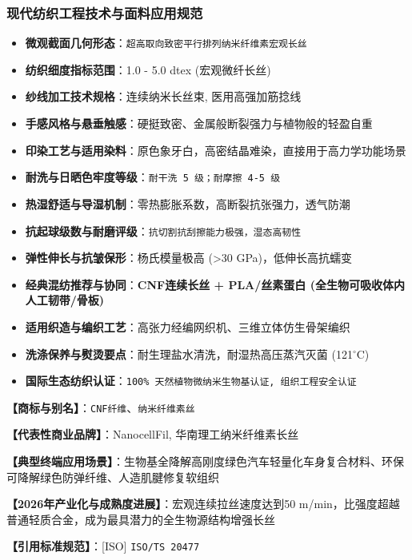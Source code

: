 \documentclass[11pt,openright,twoside,UTF8]{ctexbook}
\begin{document}
\subsubsection*{现代纺织工程技术与面料应用规范}
\begin{itemize} \setlength{\itemsep}{2pt}
    \item \textbf{微观截面几何形态}：\texttt{超高取向致密平行排列纳米纤维素宏观长丝}
    \item \textbf{纺织细度指标范围}：1.0 - 5.0 dtex (宏观微纤长丝)
    \item \textbf{纱线加工技术规格}：连续纳米长丝束, 医用高强加筋捻线
    \item \textbf{手感风格与悬垂触感}：硬挺致密、金属般断裂强力与植物般的轻盈自重
    \item \textbf{印染工艺与适用染料}：原色象牙白，高密结晶难染，直接用于高力学功能场景
    \item \textbf{耐洗与日晒色牢度等级}：\texttt{耐干洗 5 级；耐摩擦 4-5 级}
    \item \textbf{热湿舒适与导湿机制}：零热膨胀系数，高断裂抗张强力，透气防潮
    \item \textbf{抗起球级数与耐磨评级}：\texttt{抗切割抗刮擦能力极强，湿态高韧性}
    \item \textbf{弹性伸长与抗皱保形}：杨氏模量极高 (\textgreater{}30 GPa)，低伸长高抗蠕变
    \item \textbf{经典混纺推荐与协同}：\textbf{CNF连续长丝 + PLA/丝素蛋白 (全生物可吸收体内人工韧带/骨板)}
    \item \textbf{适用织造与编织工艺}：高张力经编网织机、三维立体仿生骨架编织
    \item \textbf{洗涤保养与熨烫要点}：耐生理盐水清洗，耐湿热高压蒸汽灭菌 (121$^\circ\mathrm{C}$)
    \item \textbf{国际生态纺织认证}：\texttt{100\% 天然植物微纳米生物基认证, 组织工程安全认证}
\end{itemize}
\vspace{0.2cm}

\noindent\textbf{【商标与别名】}：\texttt{CNF纤维}、\texttt{纳米纤维素丝}\par
\noindent\textbf{【代表性商业品牌】}：NanocellFil, 华南理工纳米纤维素长丝\par
\noindent\textbf{【典型终端应用场景】}：生物基全降解高刚度绿色汽车轻量化车身复合材料、环保可降解绿色防弹纤维、人造肌腱修复软组织\par
\noindent\textbf{【2026年产业化与成熟度进展】}：宏观连续拉丝速度达到50 m/min，比强度超越普通轻质合金，成为最具潜力的全生物源结构增强长丝\par
\noindent\textbf{【引用标准规范】}：[ISO] \texttt{ISO/TS 20477}\par
\vspace{0.5cm}
\end{document}
